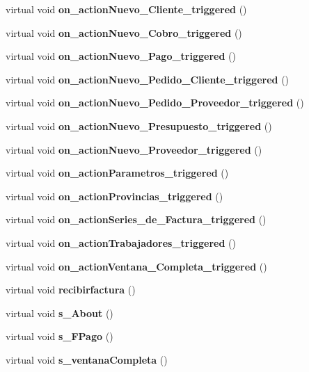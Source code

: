 \begin{CompactItemize}
\item 
virtual void {\bf on\_\-action\-Nuevo\_\-Cliente\_\-triggered} ()\label{classbulmafact_i28}

\item 
virtual void {\bf on\_\-action\-Nuevo\_\-Cobro\_\-triggered} ()\label{classbulmafact_i29}

\item 
virtual void {\bf on\_\-action\-Nuevo\_\-Pago\_\-triggered} ()\label{classbulmafact_i30}

\item 
virtual void {\bf on\_\-action\-Nuevo\_\-Pedido\_\-Cliente\_\-triggered} ()\label{classbulmafact_i31}

\item 
virtual void {\bf on\_\-action\-Nuevo\_\-Pedido\_\-Proveedor\_\-triggered} ()\label{classbulmafact_i32}

\item 
virtual void {\bf on\_\-action\-Nuevo\_\-Presupuesto\_\-triggered} ()\label{classbulmafact_i33}

\item 
virtual void {\bf on\_\-action\-Nuevo\_\-Proveedor\_\-triggered} ()\label{classbulmafact_i34}

\item 
virtual void {\bf on\_\-action\-Parametros\_\-triggered} ()\label{classbulmafact_i35}

\item 
virtual void {\bf on\_\-action\-Provincias\_\-triggered} ()\label{classbulmafact_i36}

\item 
virtual void {\bf on\_\-action\-Series\_\-de\_\-Factura\_\-triggered} ()\label{classbulmafact_i37}

\item 
virtual void {\bf on\_\-action\-Trabajadores\_\-triggered} ()\label{classbulmafact_i38}

\item 
virtual void {\bf on\_\-action\-Ventana\_\-Completa\_\-triggered} ()\label{classbulmafact_i39}

\item 
virtual void {\bf recibirfactura} ()\label{classbulmafact_i40}

\item 
virtual void {\bf s\_\-About} ()\label{classbulmafact_i41}

\item 
virtual void {\bf s\_\-FPago} ()\label{classbulmafact_i42}

\item 
virtual void {\bf s\_\-ventana\-Completa} ()\label{classbulmafact_i43}

\end{CompactItemize}
